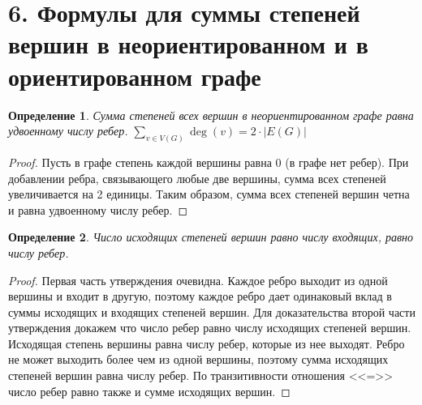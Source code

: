 \documentclass[a4paper,12pt]{article}
\newtheorem*{defin}{Определение}
\begin{document}
    \section*{6. Формулы для суммы степеней вершин в неориентированном и в ориентированном графе}

    \begin{defin}
        Сумма степеней всех вершин в неориентированном графе равна удвоенному числу ребер. $\displaystyle\sum_{v \in V(G)} \deg(v) = 2 \cdot |E(G)|$
    \end{defin}
    \begin{proof}
        Пусть в графе степень каждой вершины равна $0$ (в графе нет ребер). При добавлении ребра, связывающего любые две вершины, сумма всех степеней увеличивается на 2 единицы. Таким образом, сумма всех степеней вершин четна и равна удвоенному числу ребер.
    \end{proof}
    \begin{defin}
        Число исходящих степеней вершин равно числу входящих, равно числу ребер.
    \end{defin}
    \begin{proof}
        Первая часть утверждения очевидна. Каждое ребро выходит из одной вершины и входит в другую, поэтому каждое ребро дает одинаковый вклад в суммы исходящих и входящих степеней вершин. Для доказательства второй части утверждения докажем что число ребер равно числу исходящих степеней вершин. Исходящая степень вершины равна числу ребер, которые из нее выходят. Ребро не может выходить более чем из одной вершины, поэтому сумма исходящих степеней вершин равна числу ребер. По транзитивности отношения <<=>> число ребер равно также и сумме исходящих вершин.
    \end{proof}
\end{document}
